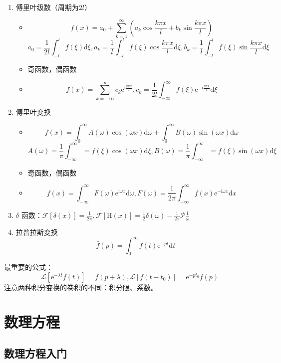 \documentclass{article}
\begin{document}
\begin{enumerate}
    \item 傅里叶级数（周期为$2l$）\begin{itemize}
        \item $$f(x)=a_0+\sum^\infty_{k=1}(a_k\cos \frac{k\pi x}{l}+b_k\sin\frac{k\pi x}{l})$$ $$a_0=\frac{1}{2l}\int^l_{-l}f(\xi)\mathrm{d}\xi,a_k=\frac{1}{l}\int^l_{-l}f(\xi)\cos\frac{k\pi x}{l}\mathrm{d}\xi,b_k=\frac{1}{l}\int^l_{-l}f(\xi)\sin\frac{k\pi x}{l}\mathrm{d}\xi$$
        \item 奇函数，偶函数
        \item $$f(x)=\sum^\infty_{k=-\infty}c_k\mathrm{e}^{\mathrm{i}\frac{k\pi x}{l}},c_k=\frac{1}{2l}\int^\infty_{-\infty}f(\xi)\mathrm{e}^{-\mathrm{i}\frac{k\pi x}{l}}\mathrm{d}\xi$$
    \end{itemize}
    \item 傅里叶变换 \begin{itemize}
        \item $$f(x)=\int^\infty_0A(\omega)\cos(\omega x)\mathrm{d}\omega+\int^\infty_0B(\omega)\sin(\omega x)\mathrm{d}\omega$$ $$A(\omega)=\frac{1}{\pi}\int^\infty_{-\infty}=f(\xi)\cos(\omega x)\mathrm{d}\xi,B(\omega)=\frac{1}{\pi}\int^\infty_{-\infty}=f(\xi)\sin(\omega x)\mathrm{d}\xi$$
        \item 奇函数，偶函数
        \item $$f(x)=\int^\infty_{-\infty}F(\omega)\mathrm{e}^{\mathrm{i}\omega x}\mathrm{d}\omega,F(\omega)=\frac{1}{2\pi}\int^\infty_{-\infty}f(x)\mathrm{e}^{-\mathrm{i}\omega x}\mathrm{d}x$$
    \end{itemize}
    \item $\delta$ 函数：$\mathscr{F}[\delta(x)]=\frac{1}{2\pi},\mathscr{F}[\mathrm{H}(x)]=\frac{1}{2}\delta(\omega)-\frac{\mathrm{i}}{2\pi}\mathscr{P}\frac{1}{\omega}$
    \item 拉普拉斯变换 $$\bar f(p)=\int^\infty_0f(t)\mathrm{e}^{-pt}\mathrm{d}t$$
\end{enumerate}
最重要的公式：
$$\mathscr{L}[\mathrm{e}^{-\lambda t}f(t)]=\bar f(p+\lambda), \mathscr{L}[f(t-t_0)]=\mathrm{e}^{-pt_0}\bar{f}(p)$$
注意两种积分变换的卷积的不同：积分限、系数。

\section{数理方程}

\subsection{数理方程入门}
\end{document}

